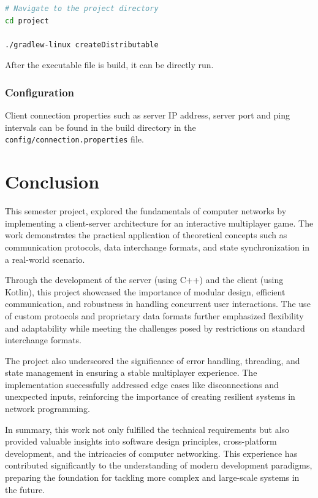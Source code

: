 \documentclass[english, sem, kiv, he, iso690alph, pdf, viewonly]{fasthesis}
\begin{document}
\begin{lstlisting}[language=bash, caption={Example of client build on Linux}, label={lst:client_build}]
# Navigate to the project directory
cd project

./gradlew-linux createDistributable
\end{lstlisting}

After the executable file is build, it can be directly run.

\subsection{Configuration}
Client connection properties such as server IP address, server port and ping intervals can be found in the build directory in the \texttt{config/connection.properties} file.


\chapter{Conclusion}

This semester project, explored the fundamentals of computer networks by implementing a client-server architecture for an interactive multiplayer game. The work demonstrates the practical application of theoretical concepts such as communication protocols, data interchange formats, and state synchronization in a real-world scenario.

Through the development of the server (using C++) and the client (using Kotlin), this project showcased the importance of modular design, efficient communication, and robustness in handling concurrent user interactions. The use of custom protocols and proprietary data formats further emphasized flexibility and adaptability while meeting the challenges posed by restrictions on standard interchange formats.

The project also underscored the significance of error handling, threading, and state management in ensuring a stable multiplayer experience. The implementation successfully addressed edge cases like disconnections and unexpected inputs, reinforcing the importance of creating resilient systems in network programming.

In summary, this work not only fulfilled the technical requirements but also provided valuable insights into software design principles, cross-platform development, and the intricacies of computer networking. This experience has contributed significantly to the understanding of modern development paradigms, preparing the foundation for tackling more complex and large-scale systems in the future.
\end{document}

